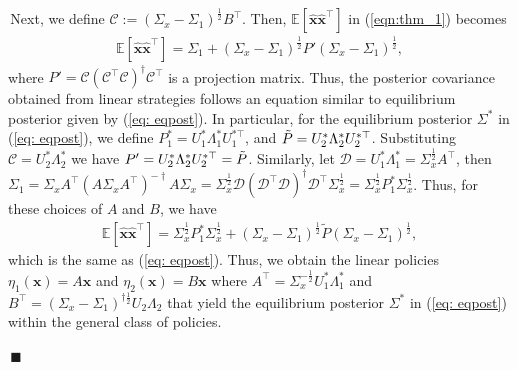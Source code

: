\documentclass[12pt,journal,onecolumn]{IEEEtran}
\newenvironment{Proof}[1]{\medskip\par\noindent{\bf Proof:\,}\,#1}{{\mbox{\,$\blacksquare$}\par}}
\begin{document}
\begin{Proof}
Next, we define $\mathcal{C}:=(\Sigma_x-\Sigma_1)^\frac{1}{2}B^\top$. Then, $\mathbb{E}[\boldsymbol{\hat{x}}\boldsymbol{\hat{x}}^\top]$ in (\ref{eqn:thm_1}) becomes 
\begin{align*}
    \mathbb{E}[\boldsymbol{\hat{x}}\boldsymbol{\hat{x}}^\top]=\Sigma_1+(\Sigma_x-\Sigma_1)^{\frac{1}{2}}P'(\Sigma_x-\Sigma_1)^{\frac{1}{2}},
\end{align*}
where $P'=\mathcal{C}(\mathcal{C}^\top\mathcal{C})^{\dagger}\mathcal{C}^\top$ is a projection matrix. Thus, the posterior covariance obtained from linear strategies follows an equation similar to equilibrium posterior given by (\ref{eq: eqpost}). %
In particular, for the equilibrium posterior $\Sigma^*$ in (\ref{eq: eqpost}), we define $P_1^*=U_1^*\Lambda_1^*U_1^{*\top}$, and $\Tilde{P}=U_{2}^*\Lambda_{2}^*U_{2}^{*\top}$. Substituting $\mathcal{C}=U_{2}^*\Lambda_{2}^*$ we have $P'=U_{2}^*\Lambda_{2}^*U_{2}^{*\top}=\Tilde{P}$. Similarly, let $\mathcal{D}=U_1^*\Lambda_1^*=\Sigma_x^{\frac{1}{2}}A^\top$, then $\Sigma_1=\Sigma_x A^\top(A\Sigma_x A^\top)^{-\dagger}A\Sigma_x=\Sigma_x^\frac{1}{2}\mathcal{D}(\mathcal{D}^\top\mathcal{D})^{\dagger}\mathcal{D}^\top\Sigma_x^{\frac{1}{2}}=\Sigma_x^{\frac{1}{2}}P_1^*\Sigma_x^{\frac{1}{2}}$. Thus, for these choices of $A$ and $B$, we have
\begin{align*}
    \mathbb{E}[\boldsymbol{\hat{x}}\boldsymbol{\hat{x}}^\top]=\Sigma_x^{\frac{1}{2}}P_{1}^*\Sigma_x^{\frac{1}{2}}+(\Sigma_x-\Sigma_{1})^{\frac{1}{2}}\tilde{P}(\Sigma_x-\Sigma_{1})^{\frac{1}{2}},
\end{align*}
which is the same as (\ref{eq: eqpost}). Thus, we obtain the linear policies
$\eta_1(\boldsymbol{x})=A\boldsymbol{x}$ and $\eta_2(\boldsymbol{x})=B\boldsymbol{x}$ where $A^\top=\Sigma_x^{-\frac{1}{2}}U_{1}^*\Lambda_{1}^*$ and $B^\top=(\Sigma_x-\Sigma_{1})^{\dagger\frac{1}{2}}U_{2}\Lambda_{2}$ that yield the equilibrium posterior $\Sigma^*$ in (\ref{eq: eqpost}) within the general class of policies.


\end{Proof}
\end{document}
